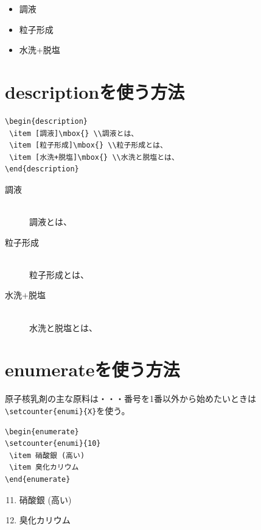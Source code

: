 \documentclass[a4j,openany,11px]{jsbook}
\begin{document}
\begin{itemize}
 \item 調液
 \item 粒子形成
 \item 水洗+脱塩
\end{itemize}
\section{descriptionを使う方法}
\begin{verbatim}
\begin{description}
 \item [調液]\mbox{} \\調液とは、
 \item [粒子形成]\mbox{} \\粒子形成とは、
 \item [水洗+脱塩]\mbox{} \\水洗と脱塩とは、
\end{description}
\end{verbatim}
\begin{description}
 \item [調液]\mbox{} \\調液とは、
 \item [粒子形成]\mbox{} \\粒子形成とは、
 \item [水洗+脱塩]\mbox{} \\水洗と脱塩とは、
\end{description}
\section{enumerateを使う方法}
原子核乳剤の主な原料は・・・番号を1番以外から始めたいときは\verb|\setcounter{enumi}{X}|を使う。
\begin{verbatim}
\begin{enumerate}
\setcounter{enumi}{10}
 \item 硝酸銀 (高い)
 \item 臭化カリウム
\end{enumerate}
\end{verbatim}
\begin{enumerate}
\setcounter{enumi}{10}
 \item 硝酸銀 (高い)
 \item 臭化カリウム
\end{enumerate}
\end{document}
